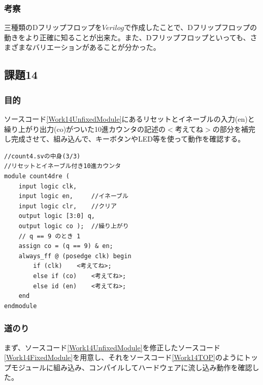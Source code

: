 \documentclass[a4paper]{jarticle}
\begin{document}
\subsubsection{考察}
三種類のDフリップフロップを$Verilog$で作成したことで、Dフリップフロップの動きをより正確に知ることが出来た。また、Dフリップフロップといっても、さまざまなバリエーションがあることが分かった。
\subsection{課題14}
\subsubsection{目的}
ソースコード\ref{Work14UnfixedModule}にあるリセットとイネーブルの入力(en)と繰り上がり出力(co)がついた10進カウンタの記述の$<$考えてね$>$の部分を補完し完成させて、組み込んで、キーボタンやLED等を使って動作を確認する。
\begin{lstlisting}[caption=count4.sv,label=Work14UnfixedModule]
//count4.svの中身(3/3)
//リセットとイネーブル付き10進カウンタ
module count4dre (
	input logic clk,
	input logic en,		//イネーブル
	input logic clr,	//クリア
	output logic [3:0] q,
	output logic co );	//繰り上がり
	// q == 9 のとき 1
	assign co = (q == 9) & en;
	always_ff @ (posedge clk) begin
		if (clk)	<考えてね>;
		else if (co)	<考えてね>;
		else id (en)	<考えてね>;
	end
endmodule
\end{lstlisting}
\subsubsection{道のり}
まず、ソースコード\ref{Work14UnfixedModule}を修正したソースコード\ref{Work14FixedModule}を用意し、それをソースコード\ref{Work14TOP}のようにトップモジュールに組み込み、コンパイルしてハードウェアに流し込み動作を確認した。


\end{document}
